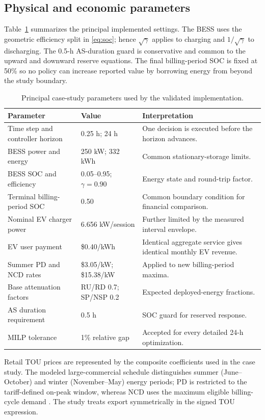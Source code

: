 \documentclass[final,5p,times]{elsarticle}
\begin{document}
\subsection{Physical and economic parameters}
Table~\ref{tab:case_parameters} summarizes the principal implemented settings. The BESS uses the geometric efficiency split in \eqref{eq:soc}; hence $\sqrt{\gamma}$ applies to charging and $1/\sqrt{\gamma}$ to discharging. The 0.5-h AS-duration guard is conservative and common to the upward and downward reserve equations. The final billing-period SOC is fixed at 50\% so no policy can increase reported value by borrowing energy from beyond the study boundary.

\begin{table}[!t]
\centering
\caption{Principal case-study parameters used by the validated implementation.}
\label{tab:case_parameters}
\small
\begin{tabularx}{\textwidth}{@{}p{}p{}X@{}}
\toprule
Parameter & Value & Interpretation \\
\midrule
Time step and controller horizon & 0.25 h; 24 h & One decision is executed before the horizon advances. \\
BESS power and energy & 250 kW; 332 kWh & Common stationary-storage limits. \\
BESS SOC and efficiency & 0.05--0.95; $\gamma=0.90$ & Energy state and round-trip factor. \\
Terminal billing-period SOC & 0.50 & Common boundary condition for financial comparison. \\
Nominal EV charger power & 6.656 kW/session & Further limited by the measured interval envelope. \\
EV user payment & \$0.40/kWh & Identical aggregate service gives identical monthly EV revenue. \\
Summer PD and NCD rates & \$3.05/kW; \$15.38/kW & Applied to new billing-period maxima. \\
Base attenuation factors & RU/RD 0.7; SP/NSP 0.2 & Expected deployed-energy fractions. \\
AS duration requirement & 0.5 h & SOC guard for reserved response. \\
MILP tolerance & 1\% relative gap & Accepted for every detailed 24-h optimization. \\
\bottomrule
\end{tabularx}
\end{table}

Retail TOU prices are represented by the composite coefficients used in the
case study. The modeled large-commercial schedule distinguishes summer
(June--October) and winter (November--May) energy periods; PD is restricted to
the tariff-defined on-peak window, whereas NCD uses the maximum eligible
billing-cycle demand \cite{sdgeLargeCommercial2025} \cite{sdgeDemandGuide2026}. The
study treats export symmetrically in the signed TOU expression. 
\end{document}
